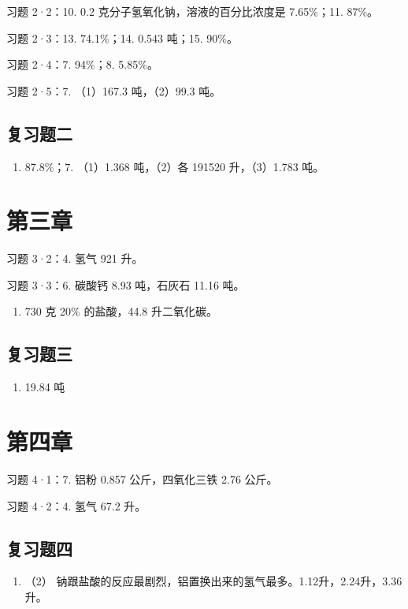 习题 2·2：10. 0.2 克分子氢氧化钠，溶液的百分比浓度是 7.65\%；11. 87\%。

习题 2·3：13. 74.1\%；14. 0.543 吨；15. 90\%。

习题 2·4：7. 94\%；8. 5.85\%。

习题 2·5：7. （1）167.3 吨，（2）99.3 吨。

\subsection{复习题二}

\begin{enumerate}[start=6]
\item
  87.8\%；7. （1）1.368 吨，（2）各 191520 升，（3）1.783 吨。
\end{enumerate}

\section{第三章}

习题 3·2：4. 氢气 921 升。

习题 3·3：6. 碳酸钙 8.93 吨，石灰石 11.16 吨。

\begin{enumerate}[start=10]
\item
  730 克 20\% 的盐酸，44.8 升二氧化碳。
\end{enumerate}

\subsection{复习题三}

\begin{enumerate}[start=8]
\item
  19.84 吨
\end{enumerate}

\section{第四章}

习题 4·1：7. 铝粉 0.857 公斤，四氧化三铁 2.76 公斤。

习题 4·2：4. 氢气 67.2 升。

\subsection{复习题四}

\begin{enumerate}[start=3]
\item
  （2）
  钠跟盐酸的反应最剧烈，铝置换出来的氢气最多。1.12升，2.24升，3.36升。
\end{enumerate}

